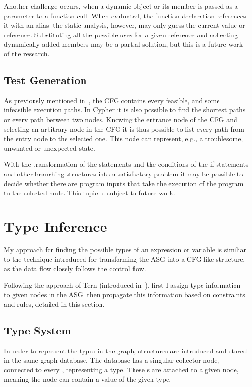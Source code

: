 Another challenge occurs, when a dynamic object or its member is passed as a parameter to a function call. When evaluated, the function declaration references it with an alias; the static analysis, however, may only guess the current value or reference. Substituting all the possible uses for a given reference and collecting dynamically added members may be a partial solution, but this is a future work of the research.

\subsection{Test Generation}
As previously mentioned in~, the CFG contains every feasible, and some infeasible execution paths. In Cypher it is also possible to find the shortest paths or every path between two nodes. Knowing the entrance node of the CFG and selecting an arbitrary node in the CFG it is thus possible to list every path from the entry node to the selected one. This node can represent, e.g., a troublesome, unwanted or unexpected state.

With the transformation of the statements and the conditions of the if statements and other branching structures into a satisfactory problem it may be possible to decide whether there are program inputs that take the execution of the program to the selected node. This topic is subject to future work.


\section{Type Inference}
My approach for finding the possible types of an expression or variable is similiar to the technique introduced for transforming the ASG into a CFG-like structure, as the data flow closely follows the control flow.

Following the approach of Tern (introduced in~), first I assign type information to given nodes in the ASG, then propagate this information based on constraints and rules, detailed in this section.

\subsection{Type System}
In order to represent the types in the graph, structures are introduced and stored in the same graph database. The database has a singular  collector node, connected to every , representing a type. These s are attached to a given node, meaning the node can contain a value of the given type.

